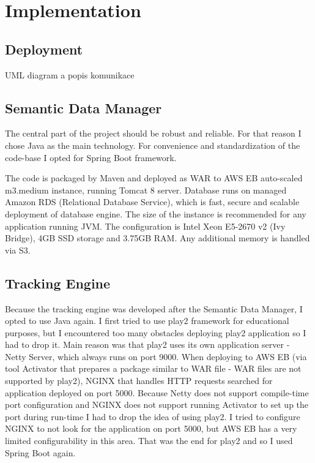 \chapter{Implementation}

\section{Deployment}
UML diagram a popis komunikace

\section{Semantic Data Manager}
The central part of the project should be robust and reliable. For that reason I chose Java as the main technology. For convenience and standardization of the code-base I opted for Spring Boot framework.

The code is packaged by Maven and deployed as WAR to AWS EB auto-scaled m3.medium instance, running Tomcat 8 server. Database runs on managed Amazon RDS (Relational Database Service), which is fast, secure and scalable deployment of database engine. The size of the instance is recommended for any application running JVM. The configuration is Intel Xeon E5-2670 v2 (Ivy Bridge), 4GB SSD storage and 3.75GB RAM. Any additional memory is handled via S3.

\section{Tracking Engine}

Because the tracking engine was developed after the Semantic Data Manager, I opted to use Java again. I first tried to use play2 framework for educational purposes, but I encountered too many obstacles deploying play2 application so I had to drop it. Main reason was that play2 uses its own application server - Netty Server, which always runs on port 9000. When deploying to AWS EB (via tool Activator that prepares a package similar to WAR file - WAR files are not supported by play2), NGINX that handles HTTP requests searched for application deployed on port 5000. Because Netty does not support compile-time port configuration and NGINX does not support running Activator to set up the port during run-time I had to drop the idea of using play2. I tried to configure NGINX to not look for the application on port 5000, but AWS EB has a very limited configurability in this area. That was the end for play2 and so I used Spring Boot again.

